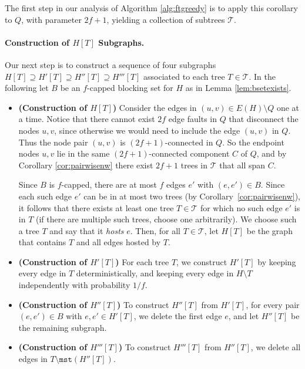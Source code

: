 \documentclass{article}
\theoremstyle{plain}
\theoremstyle{definition}
\newcommand{\mst}{\texttt{mst}}
\newcommand{\tee}{\mathcal{T}}
\begin{document}
The first step in our analysis of Algorithm \ref{alg:ftgreedy} is to apply this corollary to $Q$, with parameter $2f+1$, yielding a collection of subtrees $\tee$.

\paragraph{Construction of $H[T]$ Subgraphs.} Our next step is to construct a sequence of four subgraphs $H[T] \supseteq H'[T] \supseteq H''[T] \supseteq H'''[T]$ associated to each tree $T \in \tee$.
In the following let $B$ be an $f$-capped blocking set for $H$ as in Lemma \ref{lem:bsetexists}.

\begin{itemize}
\item \textbf{(Construction of $H[T]$)}
Consider the edges in $(u, v) \in E(H) \setminus Q$ one at a time.
Notice that there cannot exist $2f$ edge faults in $Q$ that disconnect the nodes $u, v$, since otherwise we would need to include the edge $(u, v)$ in $Q$.
Thus the node pair $(u, v)$ is $(2f+1)$-connected in $Q$.
So the endpoint nodes $u, v$ lie in the same $(2f+1)$-connected component $C$ of $Q$, and by Corollary \ref{cor:pairwisenw} there exist $2f+1$ trees in $\tee$ that all span $C$.

Since $B$ is $f$-capped, there are at most $f$ edges $e'$ with $(e, e') \in B$.
Since each such edge $e'$ can be in at most two trees (by Corollary~\ref{cor:pairwisenw}), it follows that there exists at least one tree $T \in \tee$ for which no such edge $e'$ is in $T$ (if there are multiple such trees, choose one arbitrarily).
We choose such a tree $T$ and say that it \emph{hosts} $e$.
Then, for all $T \in \tee$, let $H[T]$ be the graph that contains $T$ and all edges hosted by $T$.

\item \textbf{(Construction of $H'[T]$)}
For each tree $T$, we construct $H'[T]$ by keeping every edge in $T$ deterministically, and keeping every edge in $H \setminus T$ independently with probability $1/f$.

\item \textbf{(Construction of $H''[T]$)}
To construct $H''[T]$ from $H'[T]$, for every pair $(e, e') \in B$ with $e, e' \in H'[T]$, we delete the first edge $e$, and let $H''[T]$ be the remaining subgraph.

\item \textbf{(Construction of $H'''[T]$)}
To construct $H'''[T]$ from $H''[T]$, we delete all edges in $T \setminus \mst(H''[T])$.
\end{itemize}
\end{document}
